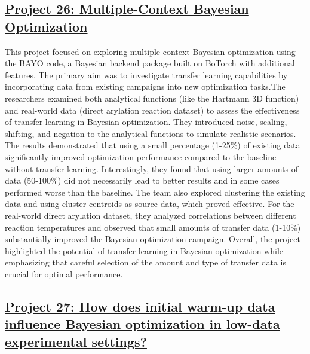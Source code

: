  \subsection*{\href{https://www.youtube.com/watch?v=wK266A0TvZ4}{Project 26: Multiple-Context Bayesian Optimization}}

This project focused on exploring multiple context Bayesian optimization using the BAYO code, a Bayesian backend package built on BoTorch with additional features. The primary aim was to investigate transfer learning capabilities by incorporating data from existing campaigns into new optimization tasks.The researchers examined both analytical functions (like the Hartmann 3D function) and real-world data (direct arylation reaction dataset) to assess the effectiveness of transfer learning in Bayesian optimization. They introduced noise, scaling, shifting, and negation to the analytical functions to simulate realistic scenarios. The results demonstrated that using a small percentage (1-25\%) of existing data significantly improved optimization performance compared to the baseline without transfer learning. Interestingly, they found that using larger amounts of data (50-100\%) did not necessarily lead to better results and in some cases performed worse than the baseline. The team also explored clustering the existing data and using cluster centroids as source data, which proved effective. For the real-world direct arylation dataset, they analyzed correlations between different reaction temperatures and observed that small amounts of transfer data (1-10\%) substantially improved the Bayesian optimization campaign. Overall, the project highlighted the potential of transfer learning in Bayesian optimization while emphasizing that careful selection of the amount and type of transfer data is crucial for optimal performance.
 \subsection*{\href{https://www.youtube.com/watch?v=4gPTMaarQt0}{Project 27: How does initial warm-up data influence Bayesian optimization in low-data experimental settings?}}


